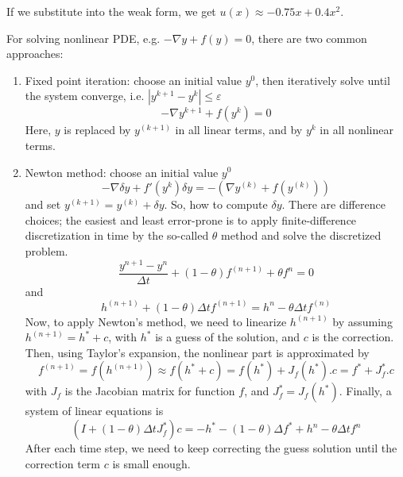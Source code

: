 If we substitute into the weak form, we get $u(x)\approx -0.75x+0.4x^2$.


For solving nonlinear PDE, e.g. $-\nabla y +f(y)=0$, there are two common
approaches:
\begin{enumerate}
  \item Fixed point iteration: choose an initial value $y^0$, then
  iteratively solve until the system converge, i.e. $|y^{k+1}-y^k|\le
  \varepsilon$
  \begin{equation}
  -\nabla y^{k+1}+f(y^k)=0
  \end{equation}
  Here, $y$ is replaced by $y^{(k+1)}$ in all linear terms, and by $y^{k}$ in
  all nonlinear terms. 
  
  \item Newton method: choose an initial value $y^0$
  \begin{equation}
  -\nabla \delta y + f'(y^{k})\delta y = - \left( \nabla y^{(k)} + f(y^{(k)})
  \right)
  \end{equation}
  and set $y^{(k+1)}=y^{(k)}+\delta y$. So, how to compute $\delta y$. There are
  difference choices; the easiest and least error-prone is to apply
  finite-difference discretization in time by the so-called $\theta$ method and
  solve the discretized problem.
  \begin{equation}
  \frac{y^{n+1}-y^{n}}{\Delta t} + (1-\theta) f^{(n+1)} + \theta f^{n} = 0 
  \end{equation}
  and
  \begin{equation}
  h^{(n+1)} + (1-\theta) \Delta t f^{(n+1)} = h^n - \theta \Delta t f^{(n)}
  \end{equation}
  Now, to apply Newton's method, we need to linearize $h^{(n+1)}$ by assuming
  $h^{(n+1)}= h^* + c$, with $h^*$ is a guess of the solution, and $c$ is the
  correction. Then, using Taylor's expansion, the nonlinear part is approximated
  by
  \begin{equation}	
  f^{(n+1)}=f(h^{(n+1)})\approx f(h^*+c) = f(h^*) + J_f(h^*).c = f^* + J^*_f.c
  \end{equation}
  with $J_f$ is the Jacobian matrix for function $f$, and $J^*_f=J_f(h^*)$.
  Finally, a system of linear equations is
  \begin{equation}
  \left( I + (1-\theta) \Delta t J^*_f  \right) c = -h^* - (1-\theta) \Delta f^*
  + h^n - \theta \Delta t f^n
  \end{equation}
  After each time step, we need to keep correcting the guess solution until the
  correction term $c$ is small enough.
  
  
\end{enumerate}
